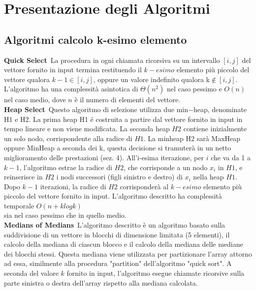 \documentclass[a4paper]{article}
\begin{document}
\section{Presentazione degli Algoritmi}
\subsection{Algoritmi calcolo k-esimo elemento}
\textbf{Quick Select}\ La procedura in ogni chiamata ricorsiva su un intervallo $[i,j]$
 del vettore fornito in input termina restituendo il $k-esimo$ elemento più piccolo del vettore qualora $k-1\in[i,j]$, oppure un valore indefinito qualora k$\not\in[i,j]$. L'algoritmo ha una complessità asintotica di $\Theta(n^2)$
 nel caso pessimo e $O(n)$ nel caso medio, dove $n$ è il numero di elementi del 
 \vspace{2mm}
 vettore.\\
\textbf{Heap Select}\ Questo algoritmo di selezione utilizza due min$-$heap, denominate H1 e H2. La prima heap H1 é costruita a partire dal vettore fornito in input in tempo lineare e non viene modificata.
La seconda heap \( H2 \) contiene inizialmente un solo nodo, corrispondente alla radice di \( H1 \). La minheap H2 sarà MaxHeap oppure MinHeap a seconda dei k, questa decisione si tramuterà in un netto miglioramento delle prestazioni (sez. 4). All'i-esima iterazione, per \( i \) che va da 1 a \( k-1 \), l'algoritmo estrae la radice di \( H2 \), che corrisponde a un nodo \( x_i \) in \( H1 \), e reinserisce in \( H2 \) i nodi successori (figli sinistro e destro) di \( x_i \) nella heap \( H1 \). Dopo \( k-1 \) iterazioni, la radice di \( H2 \) corrisponderà al \( k-esimo \) elemento più piccolo del vettore fornito in input.
L'algoritmo descritto ha complessità temporale $O(n+klogk)$\\
\vspace{2mm}
sia nel caso pessimo che in quello medio.\\\textbf{Medians of Medians}\ L'algoritmo descritto è un algoritmo basato sulla suddivisione di un vettore in blocchi di dimensione limitata (5 elementi), il calcolo della mediana di ciascun blocco e il calcolo della mediana delle mediane dei blocchi stessi. Questa mediana viene utilizzata per partizionare l'array attorno ad essa, similmente alla procedura "partition" dell'algoritmo "quick sort". A seconda del valore \( k \) fornito in input, l'algoritmo esegue chiamate ricorsive sulla parte sinistra o destra dell'array rispetto alla mediana calcolata. 
\end{document}

